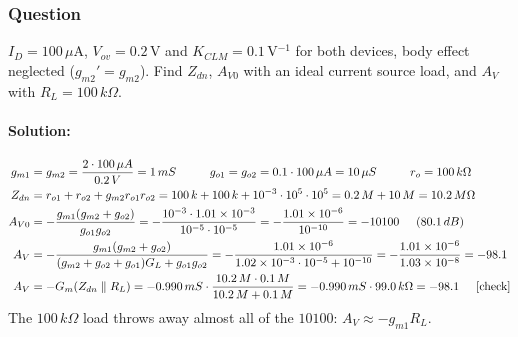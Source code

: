 \subsubsection{Question}
\(I_D = 100\,\mu\)A, \(V_{ov} = 0.2\,\)V and \(K_{CLM} = 0.1\,\)V\(^{-1}\) for both
devices, body effect neglected (\(g_{m2}' = g_{m2}\)). Find \(Z_{dn}\), \(A_{V0}\)
with an ideal current source load, and \(A_V\) with \(R_L = 100\,k\Omega\).
\paragraph{Solution:}
\begin{align*}
  g_{m1} &= g_{m2} = \frac{2 \cdot 100\,\mu A}{0.2\,V} = 1\,mS \hspace{1cm}
  g_{o1} = g_{o2} = 0.1 \cdot 100\,\mu A = 10\,\mu S \hspace{1cm} r_o = 100\,k\Omega \\
  Z_{dn} &= r_{o1} + r_{o2} + g_{m2} r_{o1} r_{o2} = 100\,k + 100\,k + 10^{-3} \cdot 10^{5} \cdot 10^{5} = 0.2\,M + 10\,M = 10.2\,M\Omega \\
  A_{V0} &= -\frac{g_{m1}(g_{m2} + g_{o2})}{g_{o1} g_{o2}} = -\frac{10^{-3} \cdot 1.01 \times 10^{-3}}{10^{-5} \cdot 10^{-5}} = -\frac{1.01 \times 10^{-6}}{10^{-10}} = -10100 \hspace{0.5cm} (80.1\,dB) \\
  A_V &= -\frac{g_{m1}(g_{m2} + g_{o2})}{(g_{m2} + g_{o2} + g_{o1}) G_L + g_{o1} g_{o2}}
       = -\frac{1.01 \times 10^{-6}}{1.02 \times 10^{-3} \cdot 10^{-5} + 10^{-10}} = -\frac{1.01 \times 10^{-6}}{1.03 \times 10^{-8}} = -98.1 \\
  A_V &= -G_m (Z_{dn} \parallel R_L) = -0.990\,mS \cdot \frac{10.2\,M \cdot 0.1\,M}{10.2\,M + 0.1\,M} = -0.990\,mS \cdot 99.0\,k\Omega = -98.1 \hspace{0.5cm} [\text{check}]
\end{align*}
The \(100\,k\Omega\) load throws away almost all of the \(10100\): \(A_V \approx -g_{m1} R_L\).

